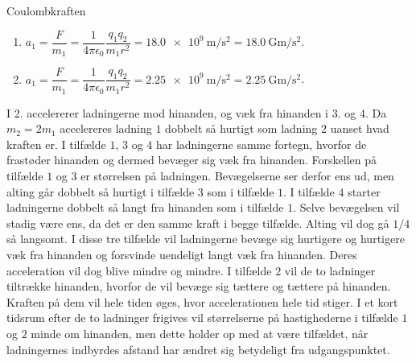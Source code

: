 \begin{opgave}{Coulombkraften}
\begin{enumerate}
        \item $a_1 = \dfrac{F}{m_1} = \dfrac{1}{4\pi\epsilon_0}\dfrac{q_1q_2}{m_1r^2} = \SI{18.0e9}{\metre\per\second\squared} = \SI{18.0}{\giga\metre\per\second\squared}$.
        \item $a_1 = \dfrac{F}{m_1} = \dfrac{1}{4\pi\epsilon_0}\dfrac{q_1q_2}{m_1r^2} = \SI{2.25e9}{\metre\per\second\squared} = \SI{2.25}{\giga\metre\per\second\squared}$.
    \end{enumerate}
    I 2. accelererer ladningerne mod hinanden, og væk fra hinanden i 3. og 4.
    \opg Da $m_2 = 2m_1$ accelereres ladning $1$ dobbelt så hurtigt som ladning $2$ uanset hvad kraften er. I tilfælde $1$, $3$ og $4$ har ladningerne samme fortegn, hvorfor de frastøder hinanden og dermed bevæger sig væk fra hinanden. Forskellen på tilfælde $1$ og $3$ er størrelsen på ladningen. Bevægelserne ser derfor ens ud, men alting går dobbelt så hurtigt i tilfælde $3$ som i tilfælde $1$. I tilfælde $4$ starter ladningerne dobbelt så langt fra hinanden som i tilfælde $1$. Selve bevægelsen vil stadig være ens, da det er den samme kraft i begge tilfælde. Alting vil dog gå $1/4$ så langsomt. I disse tre tilfælde vil ladningerne bevæge sig hurtigere og hurtigere væk fra hinanden og forsvinde uendeligt langt væk fra hinanden. Deres acceleration vil dog blive mindre og mindre. I tilfælde $2$ vil de to ladninger tiltrække hinanden, hvorfor de vil bevæge sig tættere og tættere på hinanden. Kraften på dem vil hele tiden øges, hvor accelerationen hele tid stiger. I et kort tidsrum efter de to ladninger frigives vil størrelserne på hastighederne i tilfælde $1$ og $2$ minde om hinanden, men dette holder op med at være tilfældet, når ladningernes indbyrdes afstand har ændret sig betydeligt fra udgangspunktet.
\end{opgave}

